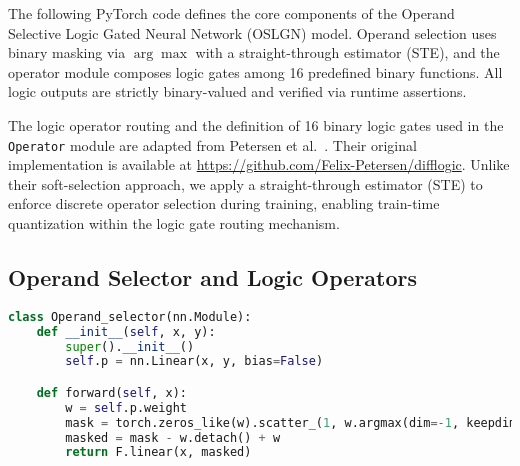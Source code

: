 \label{appendix:model-code}

The following PyTorch code defines the core components of the Operand Selective Logic Gated Neural Network (OSLGN) model.  
Operand selection uses binary masking via $\arg\max$ with a straight-through estimator (STE), and the operator module composes logic gates among 16 predefined binary functions.  
All logic outputs are strictly binary-valued and verified via runtime assertions.


The logic operator routing and the definition of 16 binary logic gates used in the \texttt{Operator} module are adapted from Petersen et al.~\cite{petersen2022deep}.  
Their original implementation is available at \url{https://github.com/Felix-Petersen/difflogic}.  
Unlike their soft-selection approach, we apply a straight-through estimator (STE) to enforce discrete operator selection during training, enabling train-time quantization within the logic gate routing mechanism.

\subsection{Operand Selector and Logic Operators}

\begin{lstlisting}[language=Python, caption={Operand selection and logic gate definitions.}]
class Operand_selector(nn.Module):
    def __init__(self, x, y):
        super().__init__()
        self.p = nn.Linear(x, y, bias=False)

    def forward(self, x):
        w = self.p.weight
        mask = torch.zeros_like(w).scatter_(1, w.argmax(dim=-1, keepdim=True), 1.0)
        masked = mask - w.detach() + w
        return F.linear(x, masked)
\end{lstlisting}

